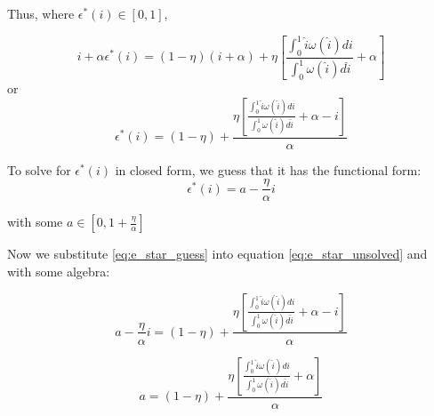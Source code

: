 \documentclass[WP]{AEA}
\begin{document}
Thus, where $ \epsilon^* (i) \in [0,1]$,

\begin{equation}
 i+\alpha \epsilon^*(i) = (1-\eta)(i+\alpha ) + \eta  \left[ \frac{\int_0^1 \hat{i} \omega(\hat{i}) di}{\int_0^1  \omega(\hat{i}) d\hat{i}} + \alpha \right] 
\end{equation}
or
\begin{equation} \label{eq:e_star_unsolved}
 \epsilon^*(i) = (1-\eta) + \frac{   \eta \left[ \frac{\int_0^1 \hat{i} \omega(\hat{i}) di}{\int_0^1  \omega(\hat{i}) d\hat{i}} + \alpha -i \right] }{\alpha} 
\end{equation}

To solve for $  \epsilon^*(i)$ in closed form, we guess that it has the functional form:
 \begin{equation} \label{eq:e_star_guess}
 \epsilon^*(i) = a-\frac{\eta }{\alpha}i
 \end{equation}
 
 with some  $a \in [0,1+\frac{\eta }{\alpha}]$

Now we substitute \ref{eq:e_star_guess} into equation \ref{eq:e_star_unsolved} and with some algebra:

$$a-\frac{\eta }{\alpha}i= (1-\eta) + \frac{   \eta \left[ \frac{\int_0^1 \hat{i} \omega(\hat{i}) di}{\int_0^1  \omega(\hat{i}) d\hat{i}} + \alpha -i \right] }{\alpha } $$

\begin{equation} \label{eq:a_solved}
a= (1-\eta) + \frac{   \eta\left[ \frac{\int_0^1 \hat{i} \omega(\hat{i}) di}{\int_0^1  \omega(\hat{i}) d\hat{i}} + \alpha  \right] }{\alpha} 
\end{equation}
\end{document}
